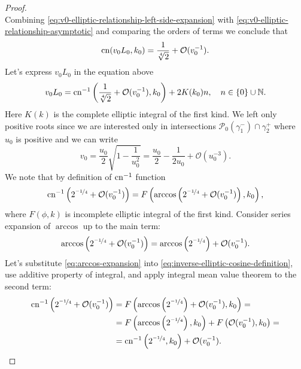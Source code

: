 \begin{proof}
\begin{equation}
	\label{eq:v0-elliptic-relationship-left-side-expansion}
	\end{equation}
	Combining \eqref{eq:v0-elliptic-relationship-left-side-expansion} with \eqref{eq:v0-elliptic-relationship-asymptotic} and comparing the orders of terms we conclude that
	\begin{equation}
		\mathrm{cn} (v_0 L_0, k_0) = \frac{1}{\sqrt[4]{2}} + \mathcal{O}(v_0^{-1}).
	\end{equation}
	Let's express $v_0 L_0$ in the equation above 
	\begin{equation}
		v_0 L_0 = \mathrm{cn}^{-1} \left( \frac{1}{\sqrt[4]{2}} + \mathcal{O}(v_0^{-1}), k_0 \right) + 2 K(k_0) n, \quad n \in \{0\} \cup \mathbb{N}.
	\label{eq:v0-L0-expression}
	\end{equation}
	Here $K(k)$ is the complete elliptic integral of the first kind. 
	We left only positive roots since we are interested only in intersections $\mathcal{P}_0(\gamma_1^-) \cap \gamma_2^+$ where $u_0$ is positive and we can write
	\begin{equation}
		v_0 = \frac{u_0}{2} \sqrt{1 - \frac{1}{u_0^2}} = \frac{u_0}{2} - \frac{1}{2u_0} + \mathcal{O}(u_0^{-3}).
	\label{eq:v0-through-u0}
	\end{equation}
	We note that by definition of $\mathrm{cn}^{-1}$ function
	\begin{equation}
		\mathrm{cn}^{-1} \left( 2^{\nicefrac{-1}{4}} + \mathcal{O}(v_0^{-1}) \right) = F \left( \arccos \left( 2^{\nicefrac{-1}{4}} + \mathcal{O}(v_0^{-1}) \right), k_0 \right),
	\label{eq:inverse-elliptic-cosine-definition}
	\end{equation}
	where $F(\phi, k)$ is incomplete elliptic integral of the first kind.
	Consider series expansion of $\arccos$ up to the main term:
	\begin{equation}
		\arccos \left( 2^{\nicefrac{-1}{4}} + \mathcal{O}(v_0^{-1}) \right) = \arccos \left( 2^{\nicefrac{-1}{4}} \right) + \mathcal{O}(v_0^{-1}).
	\label{eq:arccos-expansion}
	\end{equation}
	Let's substitute \eqref{eq:arccos-expansion} into \eqref{eq:inverse-elliptic-cosine-definition}, use additive property of integral, and apply integral mean value theorem to the second term:
	\begin{equation}
	\begin{split}
		\cn^{-1} \left( 2^{\nicefrac{-1}{4}} + \mathcal{O}(v_0^{-1}) \right) & = F \left( \arccos \left( 2^{\nicefrac{-1}{4}} \right) + \mathcal{O}(v_0^{-1}), k_0 \right) = \\ & = F \left( \arccos \left( 2^{\nicefrac{-1}{4}} \right), k_0 \right) + F \left( \mathcal{O}(v_0^{-1}), k_0 \right) = \\ & = \cn^{-1} \left( 2^{\nicefrac{-1}{4}}, k_0 \right) + \mathcal{O}(v_0^{-1}).

\end{split}
\end{equation}
\end{proof}

